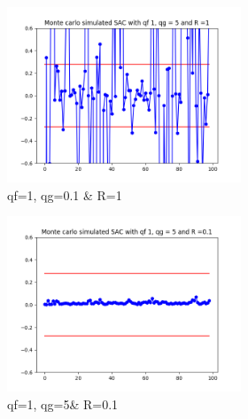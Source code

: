 \documentclass{article}
\begin{document}
\begin{figure}[H]
\begin{subfigure} {1\textwidth}
                \begin{subfigure}{.3\textwidth}  
                    \includegraphics[width=1\linewidth]{./img/mc/acc/sac1_qg5_r1.png}
                    \caption{qf=1, qg=0.1 \& R=1}
                \end{subfigure}
                \begin{subfigure}{.3\textwidth}  
                    \includegraphics[width=1\linewidth]{./img/mc/acc/sac1_qg5_r01.png}
                    \caption{qf=1, qg=5\& R=0.1}
                \end{subfigure}
                \begin{subfigure}{.3\textwidth}

\end{subfigure}
\end{subfigure}
\end{figure}
\end{document}
